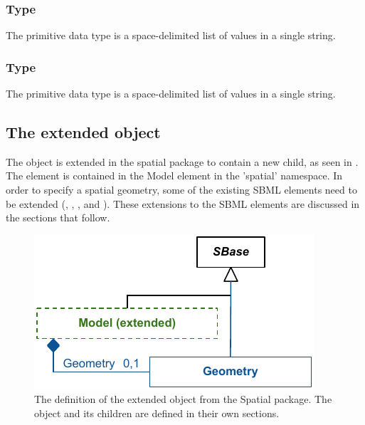 \subsubsection{Type \fixttspace{}}
\label{primtype-doublearray}

The  primitive data type is a space-delimited list of  values in a single string.  


\subsubsection{Type \fixttspace{}}
\label{primtype-integerarray}

The  primitive data type is a space-delimited list of  values in a single string.  

\clearpage


\subsection{The extended \Model object}
\label{extended-model-class}
The \Model object is extended in the spatial package to contain a new \Geometry child, as seen in
. The \Geometry element is contained in the Model element in the 'spatial' namespace. In order to specify a spatial geometry, some of the existing SBML elements need to be extended (\Compartment, \Species, \Parameter, and \Reaction). These extensions to the SBML elements are discussed in the sections that follow.
 
\begin{figure}[ht]
  \includegraphics{figs/extended-model-uml}
  \caption{The definition of the extended \Model object from the Spatial package.  The \Geometry object and its children are defined in their own sections.}
  \label{model-uml}
\end{figure}




